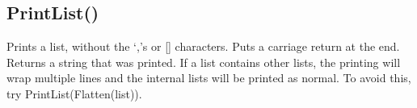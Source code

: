 \documentclass[letterpaper,10pt,english]{sphinxmanual}
\begin{document}
\ignorespaces 

\subsection{PrintList()}
\label{\detokenize{reference/utility:printlist}}\label{\detokenize{reference/utility:index-32}}
\sphinxAtStartPar
{}

\sphinxAtStartPar
Prints a list, without the ‘,’s or {[}{]}   characters. Puts a carriage return at the end.  Returns a string   that was printed.  If a list contains other lists, the printing will   wrap multiple lines and the internal lists will be printed as   normal.  To avoid this, try PrintList(Flatten(list)).

\sphinxAtStartPar
{}

\begin{sphinxVerbatim}[commandchars=\\\{\}]
\end{sphinxVerbatim}

\sphinxAtStartPar
{}

\begin{sphinxVerbatim}[commandchars=\\\{\}]
\PYG{p}{[}\PYG{p}{]}
\PYG{p}{[}\PYG{p}{[}\PYG{p}{]}\PYG{p}{[}\PYG{p}{]}\PYG{p}{[}\PYG{p}{]}\PYG{p}{]}

\PYG{p}{[}\PYG{p}{[}\PYG{p}{]}\PYG{p}{[}\PYG{p}{]}\PYG{p}{[}\PYG{p}{]}\PYG{p}{]}
\end{sphinxVerbatim}
\end{document}
